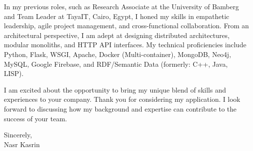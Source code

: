 \vspace{2ex}

In my previous roles, such as Research Associate at the University of Bamberg and Team Leader at TayaIT, Cairo, Egypt, I honed my skills in empathetic leadership, agile project management, and cross-functional collaboration. From an architectural perspective, I am adept at designing distributed architectures, modular monoliths, and HTTP API interfaces. My technical proficiencies include Python, Flask, WSGI, Apache, Docker (Multi-container), MongoDB, Neo4j, MySQL, Google Firebase, and RDF/Semantic Data (formerly: C++, Java, LISP).

I am excited about the opportunity to bring my unique blend of skills and experiences to your company. Thank you for considering my application. I look forward to discussing how my background and expertise can contribute to the success of your team.

\vspace{5ex}

Sincerely,\\
	
Nasr Kasrin

